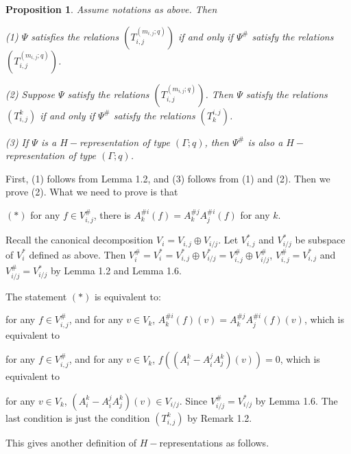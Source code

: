 \def\CTEXPreproc{Created by ctex v0.2.12, don't edit!}\documentclass[11pt]{article}
\newtheorem{prop}{Proposition}[section]
\begin{document}
   \begin{prop} Assume notations as above. Then

   (1) $\Psi$ satisfies the relations $(T^{(m_{i,j};q)}_{i,j})$ if and only if $\Psi^{\#}$ satisfy the relations $(T^{(m_{i,j};q)}_{i,j})$.

   (2) Suppose $\Psi$ satisfy the relations $(T^{(m_{i,j};q)}_{i,j})$. Then $\Psi$ satisfy the relations $(T^k _{i,j})$ if and only if
   $\Psi^{\#}$ satisfy the relations $(T^{i,j} _k) $.

   (3) If $\Psi$ is a $H-$representation of type $(\Gamma ; q)$, then $\Psi^{\#} $ is also a $H-$representation of type
   $(\Gamma ; q)$.

   \end{prop}

   \begin{pf}
  First, (1) follows from Lemma 1.2, and (3) follows from (1) and (2).  Then we prove (2). What we need to prove is that

   $(*)$  for any $f\in V^{\#}_{i,j} $, there is $ A^{\# i} _k (f) = A^{\# j} _k A^{\# i} _j (f)  $ for any $k$.

  Recall the canonical decomposition $V_i = V_{i,j} \oplus V_{i/j}  $.  Let $V^{*}_{i,j} $ and $ V^{*} _{i/j}$ be subspace of $V^{*}_i $  defined as above. Then  $V^{\#}_i = V^{*} _i = V^{*}_{i,j} \oplus V^{*} _{i/j}=  V^{\#}_{i,j} \oplus V^{\#} _{i/j} $,
   $V^{\#} _{i,j} =  V^{*}_{i,j} $ and $V^{\#} _{i/j} =  V^{*}_{i/j} $ by Lemma 1.2 and Lemma 1.6.

   The statement $(*)$ is equivalent to:

   for any $f\in V^{\#}_{i,j} $, and for any $v\in V_k$, $A^{\# i} _k (f) (v) = A^{\# j} _k A^{\# i} _j (f)  (v)  $, which is equivalent to

    for any $f\in V^{\#}_{i,j} $, and for any $v\in V_k$, $ f (  (  A^k _i - A^j _i A^k _j      )(v)     )=0    $, which is  equivalent to

    for any $v\in V_k$,  $ (  A^k _i - A^j _i A^k _j      )(v) \in V_{i/j} $. Since $V^{\#}_{i/j} = V^* _{i/j}$ by Lemma 1.6.  The last condition is just the condition $ (T^k _{i,j})$ by Remark 1.2.\\

    \end{pf}


    This gives another definition of $H-$representations as follows.
\end{document}
